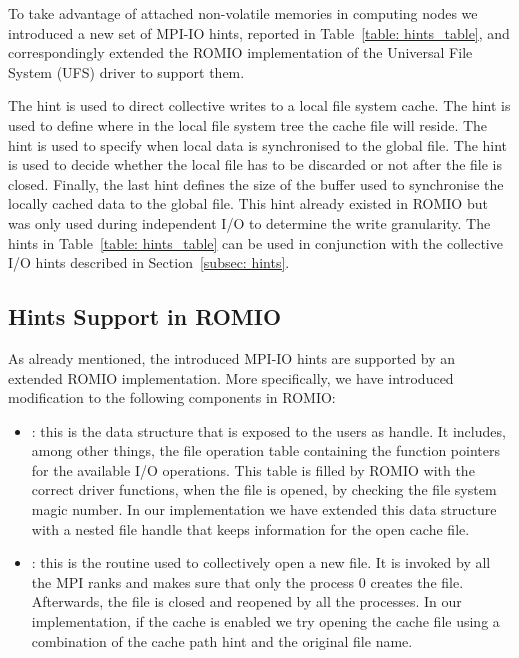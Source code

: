 To take advantage of attached non-volatile memories in computing nodes we introduced a new set of MPI-IO hints, reported in Table~\ref{table: hints_table}, and correspondingly extended the ROMIO implementation of the Universal File System (UFS) driver to support them.

The  hint is used to direct collective writes to a local file system cache.
The  hint is used to define where in the local file system tree the cache file will reside. The  hint is used to specify when local data is synchronised to the global file. The  hint is used to decide whether the local file has to be discarded or not after the file is closed. Finally, the last hint defines the size of the buffer used to synchronise the locally cached data to the global file. This hint already existed in ROMIO but was only used during independent I/O to determine the write granularity. The hints in Table~\ref{table: hints_table} can be used in conjunction with the collective I/O hints described in Section~\ref{subsec: hints}.

\subsection{Hints Support in ROMIO}
\label{subsec: support}
As already mentioned, the introduced MPI-IO hints are supported by an extended ROMIO implementation. More specifically, we have introduced modification to the following components in ROMIO:
\begin{itemize}
        \item {}: this is the data structure that is exposed to the users as  handle. It includes, among other things, the file operation table containing the function pointers for the available I/O operations. This table is filled by ROMIO with the correct driver functions, when the file is opened, by checking the file system magic number. In our implementation we have extended this data structure with a nested  file handle that keeps information for the open cache file.
        \item {}: this is the routine used to collectively open a new file. It is invoked by all the MPI ranks and makes sure that only the process 0 creates the file. Afterwards, the file is closed and reopened by all the processes. In our implementation, if the cache is enabled we try opening the cache file using a combination of the cache path hint and the original file name. 
\end{itemize}

